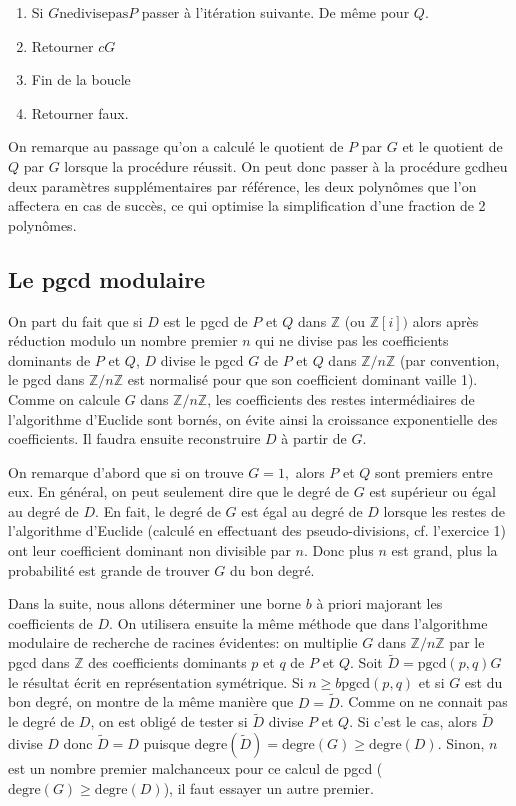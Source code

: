 \documentclass[a4paper,11pt]{book}
\begin{document}
\begin{giacjshere}
\begin{enumerate}
  \item Si $G \mbox{ne} \mbox{divise} \mbox{pas}$$P$ passer à l'itération
  suivante. De même pour $Q$.
  
  \item Retourner $c G$
  
  \item Fin de la boucle
  
  \item Retourner faux.
\end{enumerate}
On remarque au passage qu'on a calculé le quotient de $P$ par $G$ et le
quotient de $Q$ par $G$ lorsque la procédure réussit. On peut donc passer à la
procédure gcdheu deux paramètres supplémentaires par référence, les deux
polynômes que l'on affectera en cas de succès, ce qui optimise la
simplification d'une fraction de 2 polynômes.

\subsection{Le pgcd modulaire}

On part du fait que si $D$ est le pgcd de $P$ et $Q$ dans $\mathbb{Z}$ (ou
$\mathbb{Z} [ i ] )$ alors après réduction modulo un nombre premier $n$ qui ne
divise pas les coefficients dominants de $P$ et $Q$, $D$ divise le pgcd $G$ de
$P$ et $Q$ dans $\mathbb{Z} / n \mathbb{Z}$ (par convention, le pgcd dans
$\mathbb{Z} / n \mathbb{Z}$ est normalisé pour que son coefficient dominant
vaille 1). Comme on calcule $G$ dans $\mathbb{Z} / n \mathbb{Z}$, les
coefficients des restes intermédiaires de l'algorithme d'Euclide sont bornés,
on évite ainsi la croissance exponentielle des coefficients. Il faudra ensuite
reconstruire $D$ à partir de $G$.

On remarque d'abord que si on trouve $G = 1,$ alors $P$ et $Q$ sont premiers
entre eux. En général, on peut seulement dire que le degré de $G$ est
supérieur ou égal au degré de $D$. En fait, le degré de $G$ est égal au degré
de $D$ lorsque les restes de l'algorithme d'Euclide (calculé en effectuant des
pseudo-divisions, cf. l'exercice 1) ont leur coefficient dominant non
divisible par $n$. Donc plus $n$ est grand, plus la probabilité est grande de
trouver $G$ du bon degré.

Dans la suite, nous allons déterminer une borne $b$ à priori majorant 
les coefficients de
$D$. On utilisera ensuite la même méthode que dans l'algorithme modulaire de
recherche de racines évidentes: on multiplie $G$ dans $\mathbb{Z} / n
\mathbb{Z}$ par le pgcd dans $\mathbb{Z}$ des coefficients dominants $p$ et
$q$ de $P$ et $Q$. Soit $\tilde{D} = \mbox{pgcd} ( p, q ) G$ le résultat écrit
en représentation symétrique. Si $n \geq b \mbox{pgcd} ( p, q )$ et si
$G$ est du bon degré, on montre de la même manière que $D = \tilde{D}$. Comme 
on ne connait pas le degré de $D$, on est obligé de tester si $\tilde{D}$ 
divise $P$
et $Q$. Si c'est le cas, alors $\tilde{D}$ divise $D$ donc $\tilde{D} = D$
puisque $\mbox{degre} ( \tilde{D} ) = \mbox{degre} ( G ) \geq
\mbox{degre} ( D )$. Sinon, $n$ est un nombre premier malchanceux pour ce
calcul de pgcd ($\mbox{degre} ( G ) \geq \mbox{degre} ( D )$), il faut
essayer un autre premier.


\end{giacjshere}
\end{document}
